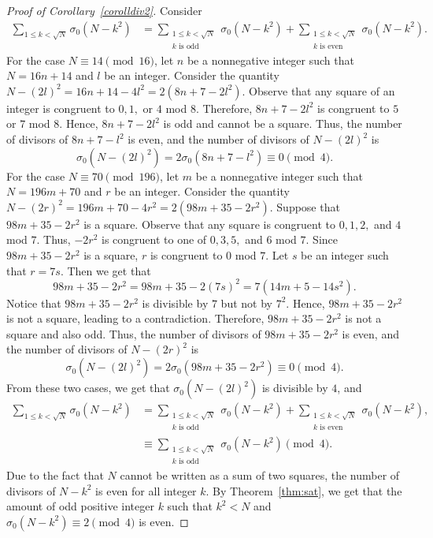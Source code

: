 \documentclass[a4paper,oneside,reqno]{amsart}
\theoremstyle{plain}
\theoremstyle{definition}
\theoremstyle{remark}
\begin{document}
		\begin{proof}[Proof of Corollary~\ref{corolldiv2}]
			Consider 
			\begin{align*}
				\sum\limits_{1\leq k<\sqrt{N}} \sigma_0(N-k^2) &= \sum_{\substack{1\leq k<\sqrt{N}\\k\text{ is odd}}} \sigma_0(N-k^2) +  \sum_{\substack{1\leq k<\sqrt{N}\\k\text{ is even}}} \sigma_0 (N - k^2).
			\end{align*}
			For the case $N\equiv 14\pmod{16}$, let $n$ be a nonnegative integer such that $N=16n+14$ and $l$ be an integer. Consider the quantity $N-(2l)^2=16n+14-4l^2=2(8n+7-2l^2)$.  Observe that any square of an integer is congruent to $0,1,$ or $4$ mod $8$. Therefore, $8n+7-2l^2$ is congruent to $5$ or $7$ mod $8$. Hence, $8n+7-2l^2$ is odd and cannot be a square. Thus, the number of divisors of $8n+7-l^2$ is even, and the number of divisors of $N-(2l)^2$ is
			$$\sigma_0(N-(2l)^2)=2\sigma_0(8n+7-l^2)\equiv 0\pmod4.$$
			For the case $N\equiv 70\pmod{196}$, let $m$ be a nonnegative integer such that $N=196m+70$ and $r$ be an integer. Consider the quantity $N-(2r)^2=196m+70-4r^2=2(98m+35-2r^2)$. Suppose that $98m+35-2r^2$ is a square. Observe that any square is congruent to $0,1,2,$ and $4$ mod $7$. Thus, $-2r^2$ is congruent to one of $0,3,5,$ and $6$ mod $7$. Since $98m+35-2r^2$ is a square, $r$ is congruent to $0$ mod $7$. Let $s$ be an integer such that $r=7s$. Then we get that
			$$98m+35-2r^2=98m+35-2(7s)^2=7(14m+5-14s^2).$$
			Notice that $98m+35-2r^2$ is divisible by $7$ but not by $7^2$. Hence, $98m+35-2r^2$ is not a square, leading to a contradiction. Therefore, $98m+35-2r^2$ is not a square and also odd. Thus, the number of divisors of $98m+35-2r^2$ is even, and the number of divisors of $N-(2r)^2$ is
			$$\sigma_0(N-(2l)^2)=2\sigma_0(98m+35-2r^2)\equiv 0\pmod4.$$
			From these two cases, we get that $\sigma_0(N-(2l)^2)$ is divisible by $4$, and
			\[\begin{split}
				\sum\limits_{1\leq k<\sqrt{N}} \sigma_0(N-k^2)
				&= \sum_{\substack{1\leq k<\sqrt{N}\\k\text{ is odd}}} \sigma_0(N-k^2) +  \sum_{\substack{1\leq k<\sqrt{N}\\k\text{ is even}}} \sigma_0 (N - k^2),\\
				&\equiv \sum_{\substack{1\leq k<\sqrt{N}\\k\text{ is odd}}} \sigma_0(N-k^2)\pmod4.
			\end{split}\]
			Due to the fact that $N$ cannot be written as a sum of two squares, the number of divisors of $N-k^2$ is even for all integer $k$. By Theorem~\ref{thm:sat}, we get that the amount of odd positive integer $k$ such that $k^2<N$ and $\sigma_0 (N - k^2) \equiv 2 \pmod 4$ is even.
		\end{proof}
		
\end{document}
